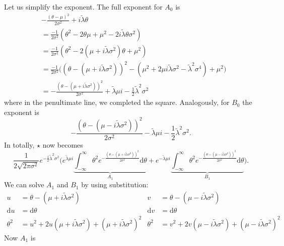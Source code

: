 \documentclass[]{report}
\begin{document}
Let us simplify the exponent. The full exponent for $A_0$ is
\begin{align}
    &-\frac{(\theta-\mu)^2}{2\sigma^2} + i\tilde{\lambda}\theta\\
    &=\frac{-1}{2\sigma^2}(\theta^2 - 2\theta\mu + \mu^2 - 2i\tilde{\lambda}\theta\sigma^2)\\
    &=\frac{-1}{2\sigma^2}(\theta^2 - 2(\mu + i\tilde{\lambda}\sigma^2)\theta + \mu^2)\\
    &=\frac{-1}{2\sigma^2}\big( (\theta - (\mu + i \tilde{\lambda} \sigma^2))^2 - (\mu^2 + 2\mu i \tilde{\lambda} \sigma^2 - \tilde{\lambda}^2 \sigma^4)+\mu^2\big)\\
    &=-\frac{(\theta - (\mu + i \tilde{\lambda} \sigma^2))^2}{2\sigma^2} + \tilde{\lambda} \mu i - \frac{1}{2}\tilde{\lambda}^2\sigma^2
\end{align}
where in the penultimate line, we completed the square. Analogously, for $B_0$ the exponent is
\begin{equation}
    -\frac{(\theta - (\mu - i \tilde{\lambda} \sigma^2))^2}{2\sigma^2} - \tilde{\lambda} \mu i - \frac{1}{2}\tilde{\lambda}^2\sigma^2.
\end{equation}
In totally, $\star$ now becomes
\begin{equation}
    \frac{1}{2\sqrt{2\pi \sigma^2}} e^{-\frac{1}{2}\tilde{\lambda}^2\sigma^2}
    \Big(
        e^{\tilde{\lambda} \mu i}\underbrace{\int_{-\infty}^{\infty}\theta^2e^{-\frac{(\theta - (\mu + i \tilde{\lambda} \sigma^2))^2}{2\sigma^2}} \text{d}\theta}_{A_1} +
        e^{-\tilde{\lambda} \mu i}\underbrace{\int_{-\infty}^{\infty}\theta^2e^{-\frac{(\theta - (\mu - i \tilde{\lambda} \sigma^2))^2}{2\sigma^2}}\text{d}\theta}_{B_1}
    \Big).
\end{equation}
We can solve $A_1$ and $B_1$ by using substitution:
\begin{align}
    u &= \theta - (\mu + i \tilde{\lambda} \sigma^2) & v &= \theta - (\mu - i \tilde{\lambda} \sigma^2)\\
    \text{d}u &= \text{d}\theta & \text{d}v &= \text{d}\theta\\
    \theta^2 &= u^2 + 2u(\mu + i \tilde{\lambda} \sigma^2) + (\mu + i \tilde{\lambda} \sigma^2)^2 &
    \theta^2 &= v^2 + 2v(\mu - i \tilde{\lambda} \sigma^2) + (\mu - i \tilde{\lambda} \sigma^2)^2
\end{align}
Now $A_1$ is
\end{document}

